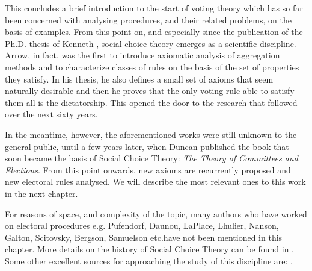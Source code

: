 This concludes a brief introduction to the start of voting theory which has so far been concerned with analysing procedures, and their related problems, on the basis of examples. From this point on, and especially since the publication of the Ph.D. thesis of Kenneth \citet{Arrow1951}, social choice theory emerges as a scientific discipline. Arrow, in fact, was the first to introduce axiomatic analysis of aggregation methods and to characterize classes of rules on the basis of the set of properties they satisfy. In his thesis, he also defines a small set of axioms that seem naturally desirable and then he proves that the only voting rule able to satisfy them all is the dictatorship. This opened the door to the research that followed over the next sixty years.

In the meantime, however, the aforementioned works were still unknown to the general public, until a few years later, when Duncan \citet{Black1958} published the book that soon became the basis of Social Choice Theory: \textit{The Theory of Committees and Elections}. From this point onwards, new axioms are recurrently proposed and new electoral rules analysed. We will describe the most relevant ones to this work in the next chapter.

For reasons of space, and complexity of the topic, many authors who have worked on electoral procedures \textemdash e.g. Pufendorf, Daunou, LaPlace, Lhulier, Nanson, Galton, Scitovsky, Bergson, Samuelson etc.\textemdash have not been mentioned in this chapter. More details on the history of Social Choice Theory can be found in \citet{Black1958,McLeanUrken1995,McLean1990,Urken2004}. Some other excellent sources for approaching the study of this discipline are: \citet{Arrow2002,Arrow2011,Gaertner2006, Taylor2005, Nitzan2009}.

